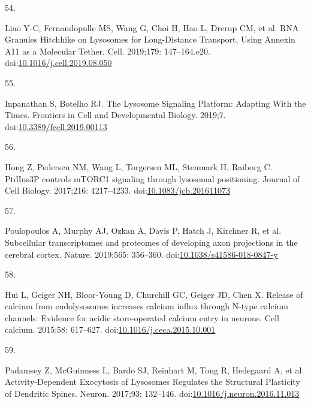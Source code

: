 \documentclass[
  12pt,
  a4paper,
]{book}
\newlength{\cslhangindent}
\newlength{\csllabelwidth}
\newlength{\cslentryspacingunit} %
\newenvironment{CSLReferences}[2] %
 {%
  \setlength{\parindent}{0pt}
  \ifodd #1
  \let\oldpar\par
  \def\par{\hangindent=\cslhangindent\oldpar}
  \fi
  \setlength{\parskip}{#2\cslentryspacingunit}
 }%
 {}
\newcommand{\CSLLeftMargin}[1]{\parbox[t]{\csllabelwidth}{#1}}
\newcommand{\CSLRightInline}[1]{\parbox[t]{\linewidth - \csllabelwidth}{#1}\break}
\begin{document}
\begin{CSLReferences}{0}{0}
\leavevmode{}%
\CSLLeftMargin{54. }%
\CSLRightInline{Liao Y-C, Fernandopulle MS, Wang G, Choi H, Hao L, Drerup CM, et al. {RNA Granules Hitchhike} on {Lysosomes} for {Long-Distance Transport}, {Using Annexin A11} as a {Molecular Tether}. Cell. 2019;179: 147--164.e20. doi:\href{https://doi.org/10.1016/j.cell.2019.08.050}{10.1016/j.cell.2019.08.050}}

\leavevmode{}%
\CSLLeftMargin{55. }%
\CSLRightInline{Inpanathan S, Botelho RJ. The {Lysosome Signaling Platform}: {Adapting With} the {Times}. Frontiers in Cell and Developmental Biology. 2019;7. doi:\href{https://doi.org/10.3389/fcell.2019.00113}{10.3389/fcell.2019.00113}}

\leavevmode{}%
\CSLLeftMargin{56. }%
\CSLRightInline{Hong Z, Pedersen NM, Wang L, Torgersen ML, Stenmark H, Raiborg C. {PtdIns3P} controls {mTORC1} signaling through lysosomal positioning. Journal of Cell Biology. 2017;216: 4217--4233. doi:\href{https://doi.org/10.1083/jcb.201611073}{10.1083/jcb.201611073}}

\leavevmode{}%
\CSLLeftMargin{57. }%
\CSLRightInline{Poulopoulos A, Murphy AJ, Ozkan A, Davis P, Hatch J, Kirchner R, et al. Subcellular transcriptomes and proteomes of developing axon projections in the cerebral cortex. Nature. 2019;565: 356--360. doi:\href{https://doi.org/10.1038/s41586-018-0847-y}{10.1038/s41586-018-0847-y}}

\leavevmode{}%
\CSLLeftMargin{58. }%
\CSLRightInline{Hui L, Geiger NH, Bloor-Young D, Churchill GC, Geiger JD, Chen X. Release of calcium from endolysosomes increases calcium influx through {N-type} calcium channels: {Evidence} for acidic store-operated calcium entry in neurons. Cell calcium. 2015;58: 617--627. doi:\href{https://doi.org/10.1016/j.ceca.2015.10.001}{10.1016/j.ceca.2015.10.001}}

\leavevmode{}%
\CSLLeftMargin{59. }%
\CSLRightInline{Padamsey Z, McGuinness L, Bardo SJ, Reinhart M, Tong R, Hedegaard A, et al. Activity-{Dependent Exocytosis} of {Lysosomes Regulates} the {Structural Plasticity} of {Dendritic Spines}. Neuron. 2017;93: 132--146. doi:\href{https://doi.org/10.1016/j.neuron.2016.11.013}{10.1016/j.neuron.2016.11.013}}


\end{CSLReferences}
\end{document}
